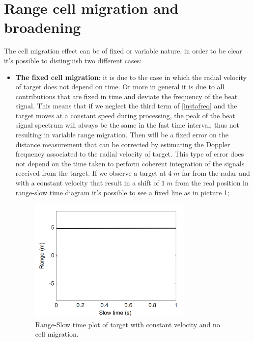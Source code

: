 \section{Range cell migration and broadening}
The cell migration effect can be of fixed or variable nature, in order to be clear it's possible to distinguish two different cases:
\begin{itemize}
     \item \textbf{The fixed cell migration}: it is due to the case in which the radial velocity of target does not depend on time. Or more in general it is due to all contributions that are fixed in time and deviate the frequency of the beat signal. This means that if we neglect the third term of \ref{instafreq} and the target moves at a constant speed during processing, the peak of the beat signal spectrum will always be the same in the fast time interval, thus not resulting in variable range migration. Then will be a fixed error on the distance measurement that can be corrected by estimating the Doppler frequency associated to the radial velocity of target. This type of error does not depend on the time taken to perform coherent integration of the signals received from the target. If we observe a target at $4\; m$ far from the radar and with a constant velocity that result in a shift of $1 \;m$ from the real position in range-slow time diagram it's possible to see a fixed line as in picture \ref{fixed_range_slow_time_fig};
     \begin{figure}[h!]
     \centering
     \includegraphics[width=8cm]{Time-frequency analysis-chap3/img/fixed range-slow time.png}
     \caption{Range-Slow time plot of target with constant velocity and no cell migration.}
     \label{fixed_range_slow_time_fig}
     \end{figure}


\end{itemize}
